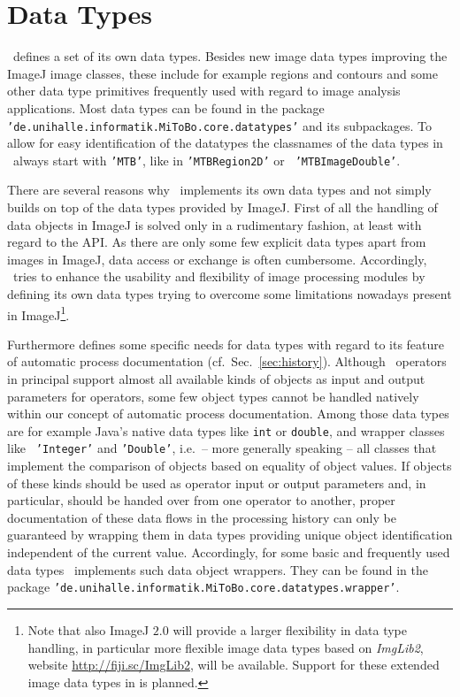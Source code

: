 \chapter{\mitobo Data Types}
\label{chap:dataTypes}
\mitobo\ defines a set of its own data types. Besides new image data types
improving the ImageJ image classes, these
include for example regions and contours and some other data type primitives frequently used
with regard to image analysis applications. 
Most data types can be found in the package {\tt 'de.unihalle.informatik.MiToBo.core.datatypes'} and its
subpackages.
To allow for easy identification of the datatypes the
classnames of the data types in \mitobo\ always start with {\tt 'MTB'}, like in {\tt 'MTBRegion2D'} or {\tt
'MTBImageDouble'}.

There are several reasons why \mitobo\ implements its own data types and not
simply builds on top of the data types provided by ImageJ. First of all the handling of data objects in ImageJ is solved only in
a rudimentary fashion, at least with regard to the API. As there are only some few explicit data types apart from
images in ImageJ, data access or exchange is often cumbersome. Accordingly, \mitobo\ tries to enhance the usability and
flexibility of image processing modules by defining its own data types trying to overcome some limitations
nowadays present in ImageJ\footnote{Note that also ImageJ $2.0$ will provide a larger flexibility in data type handling, in particular 
more flexible image data types based on {\em ImgLib2}, website \href{http://fiji.sc/ImgLib2}{http://fiji.sc/ImgLib2},
will be available. Support for these extended image data types in \mitobo is planned.}.

Furthermore \mitobo defines some specific needs for data types with regard to its
feature of automatic process documentation (cf.~Sec.~\ref{sec:history}). 
Although \mitobo\ operators in principal support almost all available kinds of
objects as input and output parameters for operators, some few object
types cannot be handled natively within our concept of automatic process documentation.
Among those data types are for example Java's native data types like {\tt int} or {\tt double}, and wrapper classes like {\tt
'Integer'} and {\tt 'Double'}, i.e.~-- more generally speaking -- all
classes that implement the comparison of objects based on equality of object
values. If objects of these kinds should be used as operator input or output
parameters and, in particular, should be handed over from one operator to another, proper documentation of these data flows in the 
processing history can only be guaranteed by wrapping them in data types providing unique object identification independent of 
the current value. Accordingly, for some basic and frequently used data types \mitobo\ implements such data object wrappers.
They can be found in the package {\tt 'de.unihalle.informatik.MiToBo.core.datatypes.wrapper'}. 

